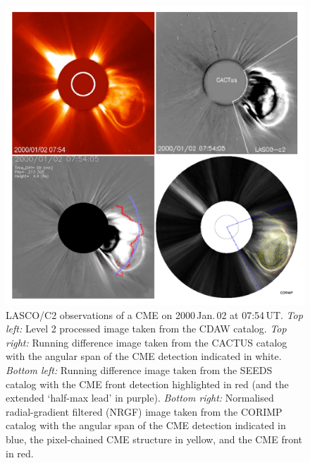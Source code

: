 \documentclass[referee,a4paper,12pt,traditabstract]{swsc}
\begin{document}
\begin{linenumbers}
\begin{figure}[!h]
\centerline{\includegraphics[width=\linewidth]{images/20000102_four.pdf}}
\caption{LASCO/C2 observations of a CME on 2000\,Jan.\,02 at 07:54\,UT. \emph{Top left:} Level 2 processed image taken from the CDAW catalog. \emph{Top right:} Running difference image taken from the CACTUS catalog with the angular span of the CME detection indicated in white. \emph{Bottom left:} Running difference image taken from the SEEDS catalog with the CME front detection highlighted in red (and the extended `half-max lead' in purple). \emph{Bottom right:} Normalised radial-gradient filtered (NRGF) image taken from the CORIMP catalog with the angular span of the CME detection indicated in blue, the pixel-chained CME structure in yellow, and the CME front in red.}
\label{20000102_four}
\end{figure}


\end{linenumbers}
\end{document}
